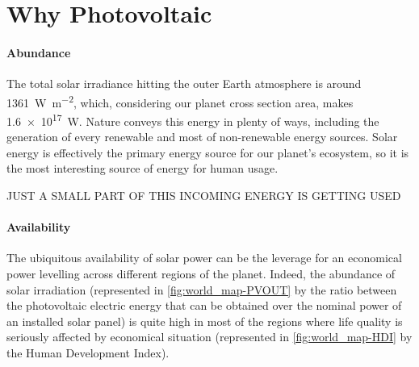 
\section{Why Photovoltaic}

	\paragraph{Abundance}
	The total solar irradiance hitting the outer Earth atmosphere is around \SI{1361}{\watt\per\square\metre},\cite{Kopp2011} which, considering our planet cross section area, makes \SI{1.6e17}{\watt}.
	Nature conveys this energy in plenty of ways, including the generation of every renewable and most of non-renewable energy sources.
	Solar energy is effectively the primary energy source for our planet's ecosystem, so it is the most interesting source of energy for human usage.

	JUST A SMALL PART OF THIS INCOMING ENERGY IS GETTING USED


	\paragraph{Availability}
	The ubiquitous availability of solar power can be the leverage for an economical power levelling across different regions of the planet.
	Indeed, the abundance of solar irradiation (represented in \cref{fig:world_map-PVOUT} by the ratio between the photovoltaic electric energy that can be obtained over the nominal power of an installed solar panel) is quite high in most of the regions where life quality is seriously affected by economical situation (represented in \cref{fig:world_map-HDI} by the Human Development Index).

